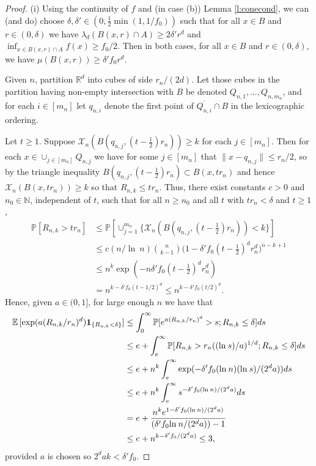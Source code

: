 \documentclass[12pt]{article}
\newcommand{\N}{\mathbb{N}}
\renewcommand{\Pr}{\mathbb{P}}
\newcommand{\X}{\mathcal{X}}
\newcommand{\E}{\mathbb E \,}
\newcommand{\R}{\mathbb{R}}
\renewcommand{\log}{{\ln \:}}
\begin{document}
\begin{proof}
	(i) 
	Using the continuity of $f$ and (in case (b)) 
	Lemma \ref{l:conecond}, we can (and do) choose
	$\delta, \delta' \in ( 0, \frac12 \min(1, 1/f_0))$ such that 
	for all $x \in B $ and $r \in (0,\delta)$ we have
	$\lambda_d(B(x,r) \cap A) \geq 2 \delta' r^d$ and
	$\inf_{x \in B(x,r) \cap A} f(x) \geq f_0/2$.
	Then in both cases, for all $x \in B$ and $r \in (0,\delta)$,
	we have $\mu(B(x,r)) \geq \delta' f_0 r^d$.

	Given $n$, partition  $\R^d$ into cubes  
	of side $r_n/(2d)$. Let those cubes in the partition  having
	non-empty intersection with   %
	$B$ be denoted
	$Q_{n,1},\ldots, Q_{n,m_n}$, and for each $i \in [m_n]$
	let $q_{n,i}$ denote the first point of $\overline{Q_{n,i}} 
	\cap B$ in the lexicographic ordering.

Let $t \geq 1$.
	Suppose $\X_n ( B(q_{n,j}, (t- \frac12) r_n)) \geq k$
for  each $j \in [m_n]$.
	Then for  each $x \in \cup_{j \in [m_n]} Q_{n,j}$
	we have
	for some $j \in [m_n]$ that
	$\|x-q_{n,j} \| \leq r_n/2$,
	so by the triangle inequality
	$B(q_{n,j},(t- \frac12) r_n) \subset B(x,t r_n)$ and hence
	$\X_n(B(x,t r_n)) \geq k$
	so that $R_{n,k} \leq t r_n$. Thus,
there exist constants $c >0$ and $n_0 \in \N$,
 independent of $t$, such that
for all $n \geq n_0$ and all $t$ with
 $t r_n < \delta$ and $t \geq 1$, 
	\begin{align*}
	\Pr[ R_{n,k} > t r_n] & \leq \Pr [ \cup_{j=1}^{m_n} 
	\{ \X_n ( B(q_{n,j},(t- \tfrac12) r_n )) < k  \} ]
\\
	& \leq c (n/\log n) \binom{n}{k-1}
	\big(1 -  \delta' f_0 (t - \tfrac12 )^d  r_n^d \big)^{n-k+1}
\\
	& \leq n^k \exp (- n \delta' f_0 (t- \tfrac12)^d r_n^d) 
\\
		& =  n^{k- \delta' f_0(t-1/2)^d} \leq n^{k- \delta' f_0(t/2)^d}.
		\end{align*}
	Hence, given $a \in ( 0,1]$, for large enough $n$ we have that
	\begin{align}
	\E[ \exp(a (R_{n,k}/r_n)^d ) {\bf 1}_{\{R_{n,k} < \delta \}} ]
		& \leq \int_0^\infty \Pr[ e^{a (R_{n,k}/r_n)^d} > s; R_{n,k} \leq \delta] ds
\nonumber \\
		& \leq e +  \int_e^\infty \Pr[  R_{n,k} > r_n( (\log s)/a)^{1/d}; R_{n,k} \leq \delta] ds
\nonumber \\
		& \leq e+  n^k \int_e^\infty \exp(   - \delta' 
		f_0 (\log n) (\log s) / (2^{d} a )) ds
\nonumber \\
		& \leq e+  n^k \int_e^\infty s^{ - \delta' f_0 (\log n) / (2^{d} a )}  ds
\nonumber \\
		& = e + \frac{n^k e^{1- \delta' f_0 (\log n)/(2^{d} a) } }{
			(\delta' f_0 \log n/(2^{d} a)) -1 } 
\nonumber \\
		& \leq e + n^{ k - \delta' f_0 /(2^{d} a)} \leq 3, 
\label{0308a}
	\end{align}
provided $a$ is chosen so $2^{d} a k  < \delta' f_0 $.




\end{proof}
\end{document}
